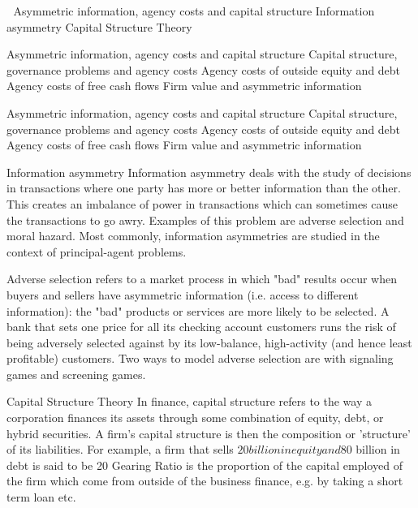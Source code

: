 

Asymmetric information, agency costs and capital structure
Information asymmetry
Capital Structure Theory

Asymmetric information, agency costs and capital structure
Capital structure, governance problems and agency costs
Agency costs of outside equity and debt
Agency costs of free cash flows
Firm value and asymmetric information




Asymmetric information, agency costs and capital structure
Capital structure, governance problems and agency costs
Agency costs of outside equity and debt
Agency costs of free cash flows
Firm value and asymmetric information


Information asymmetry
Information asymmetry deals with the study of decisions in transactions where one party has more or better information than the other. This creates an imbalance of power in transactions which can sometimes cause the transactions to go awry. Examples of this problem are adverse selection and moral hazard. Most commonly, information asymmetries are studied in the context of principal-agent problems.


Adverse selection refers to a market process in which "bad" results occur when buyers and sellers have asymmetric information (i.e. access to different information): the "bad" products or services are more likely to be selected. A bank that sets one price for all its checking account customers runs the risk of being adversely selected against by its low-balance, high-activity (and hence least profitable) customers. Two ways to model adverse selection are with signaling games and screening games.

Capital Structure Theory
In finance, capital structure refers to the way a corporation finances its assets through some combination of equity, debt, or hybrid securities. A firm's capital structure is then the composition or 'structure' of its liabilities. For example, a firm that sells $20 billion in equity and $80 billion in debt is said to be 20%
Gearing Ratio is the proportion of the capital employed of the firm which come from outside of the business finance, e.g. by taking a short term loan etc.







